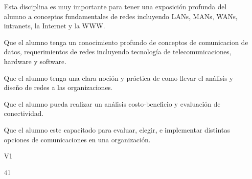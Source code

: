 \begin{syllabus}


\begin{justification}
	Esta disciplina es muy importante para tener una exposición profunda del alumno a conceptos fundamentales de redes incluyendo LANs, MANs, WANs, intranets, la Internet y la WWW.
	\end{justification}
	
	\begin{goals}
	\item Que el alumno tenga un conocimiento profundo de conceptos de comunicacion de datos, requerimientos de redes incluyendo tecnología de telecomunicaciones, hardware y software.
	\item Que el alumno tenga una clara noción y práctica de como llevar el análisis y diseño de redes a las organizaciones.
	\item Que el alumno pueda realizar un análisis costo-beneficio y evaluación de conectividad.
	\item Que el alumno este capacitado para evaluar, elegir, e implementar distintas opciones de comunicaciones en una organización.
	\end{goals}
	
	\begin{outcomes}{V1}
		\item {}
		\item {}
		\item {}
		\item {}
		\item {}
		\item {}
	\end{outcomes}
	
	\begin{unit}{\LUTHREETWODef}{}{\LUTHREETWOBib}{4}{1}
	   \begin{topics}
				\item \ITFIVETopicONExFIVExTWO
				\item \ITFIVETopicONExFIVExFOUR
				\item \ITFIVETopicONExFIVExSIX
	   \end{topics}
		\LUTHREETWOGoal
	\end{unit}
	

\end{syllabus}
